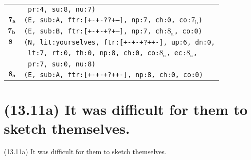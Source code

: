 \documentclass{article}
\begin{document}
\begin{minipage}{\textwidth}
{\begin{tabular}{|r|l|}
    & \texttt{\texttt{~pr:4,~su:8,~nu:7)}} \\
    ${\textbf{\textrm{7}}_{\textbf{\textrm{a}}}}$ & \texttt{\texttt{(E,~sub:A,~ftr:[+-+-??+--],~np:7,~ch:0,~co:${\textrm{7}_{\textrm{b}}}$)}} \\
    ${\textbf{\textrm{7}}_{\textbf{\textrm{b}}}}$ & \texttt{\texttt{(E,~sub:B,~ftr:[+-+-+?+--],~np:7,~ch:${\textrm{8}_{\textrm{a}}}$,~co:0)}} \\
    ${\textbf{\textrm{8}}_{\phantom{z}}}$ & \texttt{\texttt{(N,~lit:yourselves,~ftr:[+-+-+?++-],~up:6,~dn:0,}} \\
    & \texttt{\texttt{~lt:7,~rt:0,~th:0,~np:8,~ch:0,~co:${\textrm{8}_{\textrm{a}}}$,~ec:${\textrm{8}_{\textrm{a}}}$,}} \\
    & \texttt{\texttt{~pr:7,~su:0,~nu:8)}} \\
    ${\textbf{\textrm{8}}_{\textbf{\textrm{a}}}}$ & \texttt{\texttt{(E,~sub:A,~ftr:[+-+-+?++-],~np:8,~ch:0,~co:0)}} \\
    \hline
  \end{tabular}
  }
\end{minipage}
\bigbreak

\clearpage

%
%

\section*{(13.11a) It was difficult for them to sketch themselves.}

\bigbreak
\begin{enumerate*}
\item[(13.11a)] It was difficult for them to sketch themselves.
\end{enumerate*}
\bigbreak
\end{document}
